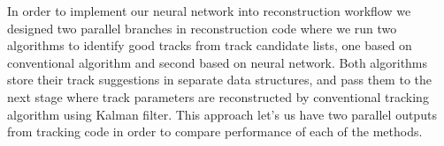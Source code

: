 In order to implement our neural network into reconstruction workflow we designed two parallel branches in reconstruction code where we run 
two algorithms to identify good tracks from track candidate lists, one based on conventional algorithm and second based on neural network.
Both algorithms store their track suggestions in separate data structures, and pass them to the next stage where track parameters are reconstructed by 
conventional tracking algorithm using Kalman filter. This approach let's us have two parallel outputs from tracking code in order to compare performance of
each of the methods.

